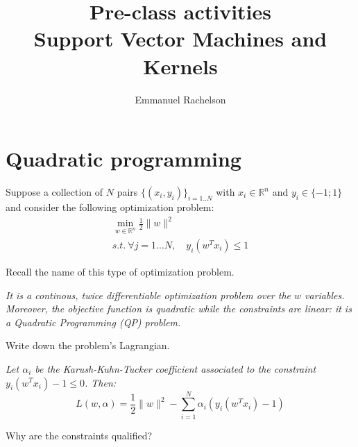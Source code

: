 \documentclass{article}
\author{Emmanuel Rachelson}
\title{Pre-class activities\\Support Vector Machines and Kernels}
\date{}
\begin{document}
\maketitle

\section{Quadratic programming}


Suppose a collection of $N$ pairs $\{(x_i,y_i)\}_{i=1..N}$ with $x_i\in \mathbb{R}^n$ and $y_i \in \{-1;1\}$ and consider the following optimization problem:
\begin{gather*}
\min_{w\in\mathbb{R}^n} \frac{1}{2}\|w\|^2\\
s.t. \ \forall j=1...N, \quad y_i \left( w^T x_i \right) \leq 1
\end{gather*}

\noindent {} Recall the name of this type of optimization problem.

{\it It is a continous, twice differentiable optimization problem over the $w$ variables. Moreover, the objective function is quadratic while the constraints are linear: it is a Quadratic Programming (QP) problem.}

\noindent {} Write down the problem's Lagrangian.

{\it Let $\alpha_i$ be the Karush-Kuhn-Tucker coefficient associated to the constraint $y_i \left( w^T x_i \right) -1 \leq 0$. Then:
\begin{equation*}
L(w,\alpha) = \frac{1}{2}\|w\|^2 - \sum\limits_{i=1}^N \alpha_i \left( y_i \left( w^T x_i \right) -1 \right)
\end{equation*}
}

\noindent {} Why are the constraints qualified?
\end{document}
